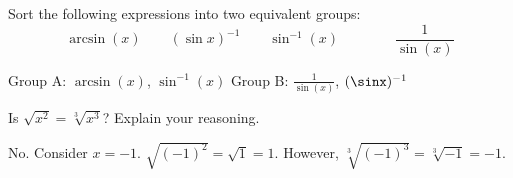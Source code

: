 \begin{exercises}
\begin{exercise}
Sort the following expressions into two equivalent groups:
\[
\arcsin(x) \qquad (\sin x)^{-1} \qquad  \sin^{-1}(x) \qquad \qquad \frac{1}{\sin(x)} 
\]
\begin{answer}
Group A: $\arcsin(x)$, $\sin^{-1}(x)$
Group B: $\frac{1}{\sin(x)}$, $(\sinx)^{-1}$
\end{answer}
\end{exercise}

\begin{exercise} 
Is $\sqrt{x^2} = \sqrt[3]{x^3}$? Explain your reasoning.
\begin{answer}
No. Consider $x = -1$. $\sqrt{(-1)^2} = \sqrt{1} = 1$. However, $\sqrt[3]{(-1)^3} =  \sqrt[3]{-1} = -1$.  
\end{answer}
\end{exercise}



\end{exercises}
